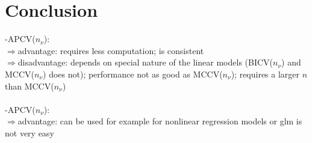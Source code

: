 \documentclass[Research_Module_ES.tex]{subfiles}
\begin{document}
\section{Conclusion}
-APCV($n_\nu$):\\ 
$\Rightarrow$advantage: requires less computation; is consistent\\
$\Rightarrow$disadvantage: depends on special nature of the linear models (BICV($n_\nu$) and MCCV($n_\nu$) does not); performance not as good as MCCV($n_\nu$); requires a larger $n$ than MCCV($n_\nu$)\\\\
-APCV($n_\nu$):\\
$\Rightarrow$advantage: can be used for example for nonlinear regression models or glm is not very easy\\
\end{document}
